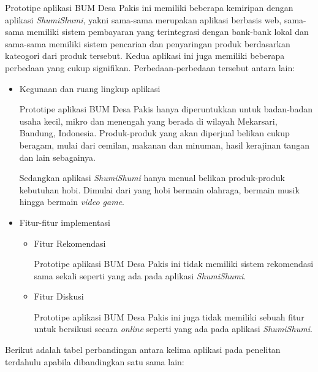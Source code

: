 \documentclass[a4paper]{article}
\begin{document}
\begin{itemize}
\begin{enumerate}
        Prototipe aplikasi BUM Desa Pakis ini memiliki beberapa kemiripan dengan aplikasi \textit{ShumiShumi}, yakni sama-sama merupakan aplikasi berbasis web, sama-sama memiliki sistem pembayaran yang terintegrasi dengan bank-bank lokal dan sama-sama memiliki sistem pencarian dan penyaringan produk berdasarkan kateogori dari produk tersebut. Kedua aplikasi ini juga memiliki beberapa perbedaan yang cukup signifikan. Perbedaan-perbedaan tersebut antara lain:
    
        \begin{itemize}
            \item Kegunaan dan ruang lingkup aplikasi
    
            Prototipe aplikasi BUM Desa Pakis hanya diperuntukkan untuk badan-badan usaha kecil, mikro dan menengah yang berada di wilayah Mekarsari, Bandung, Indonesia. Produk-produk yang akan diperjual belikan cukup beragam, mulai dari cemilan, makanan dan minuman, hasil kerajinan tangan dan lain sebagainya\autocite{bum-mekarsari}.
    
            Sedangkan aplikasi \textit{ShumiShumi} hanya menual belikan produk-produk kebutuhan hobi. Dimulai dari yang hobi bermain olahraga, bermain musik hingga bermain \textit{video game}.
    
            \item Fitur-fitur implementasi
    
            \begin{itemize}
                \item Fitur Rekomendasi
    
                Prototipe aplikasi BUM Desa Pakis ini tidak memiliki sistem rekomendasi sama sekali seperti yang ada pada aplikasi \textit{ShumiShumi}\autocite{bum-mekarsari}.
    
                \item Fitur Diskusi
    
                Prototipe aplikasi BUM Desa Pakis ini juga tidak memiliki sebuah fitur untuk bersikusi secara \textit{online} seperti yang ada pada aplikasi \textit{ShumiShumi}\autocite{bum-mekarsari}.
    
            \end{itemize}
    
        \end{itemize}
    
    \end{enumerate}

    Berikut adalah tabel perbandingan antara kelima aplikasi pada penelitan terdahulu apabila dibandingkan satu sama lain:


\end{itemize}
\end{document}
